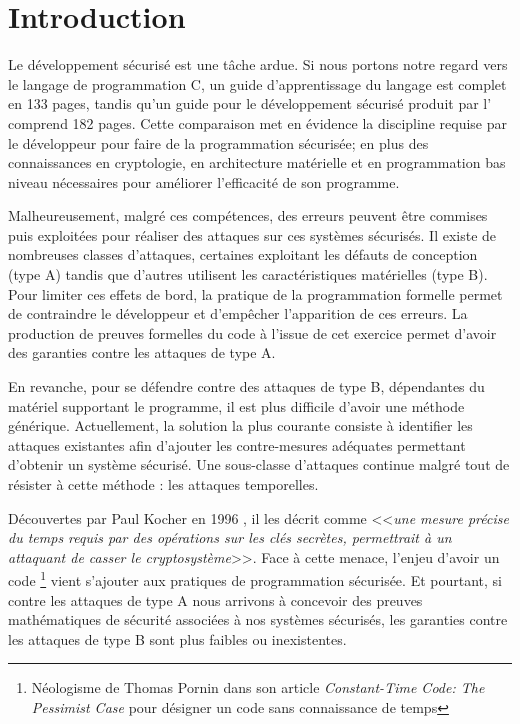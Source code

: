 \chapter*{Introduction}

Le développement sécurisé est une tâche ardue. Si nous portons notre regard vers le langage de programmation C, un guide \cite{progC_guide} d'apprentissage du langage est complet en 133 pages, tandis qu'un guide pour le développement sécurisé\cite{anssi_guideForSecureprogramming} produit par l' comprend 182 pages. Cette comparaison met en évidence la discipline requise par le développeur pour faire de la programmation sécurisée; en plus des connaissances en cryptologie, en architecture matérielle et en programmation bas niveau nécessaires pour améliorer l'efficacité de son programme. \medbreak

Malheureusement, malgré ces compétences, des erreurs peuvent être commises puis exploitées pour réaliser des attaques sur ces systèmes sécurisés. Il existe de nombreuses classes d'attaques, certaines exploitant les défauts de conception (type A) tandis que d'autres utilisent les caractéristiques matérielles (type B). Pour limiter ces effets de bord, la pratique de la programmation formelle permet de contraindre le développeur et d'empêcher l'apparition de ces erreurs. La production de preuves formelles du code à l'issue de cet exercice permet d'avoir des garanties contre les attaques de type A.\medbreak

En revanche, pour se défendre contre des attaques de type B, dépendantes du matériel supportant le programme, il est plus difficile d'avoir une méthode générique. Actuellement, la solution la plus courante consiste à identifier les attaques existantes afin d'ajouter les contre-mesures adéquates permettant d'obtenir un système sécurisé. Une sous-classe d'attaques continue malgré tout de résister à cette méthode : les attaques temporelles.\medbreak

Découvertes par Paul Kocher en 1996 \cite{crypto-1996-1469}, il les décrit comme <<\textit{une mesure précise du temps requis par des opérations sur les clés secrètes, permettrait à un attaquant de casser le cryptosystème}>>. Face à cette menace, l'enjeu d'avoir un code \textit{}\footnote{Néologisme de Thomas Pornin dans son article \textit{Constant-Time Code: The Pessimist Case} \cite{constantTimePornin} pour désigner un code sans connaissance de temps} vient s'ajouter aux pratiques de programmation sécurisée. Et pourtant, si contre les attaques de type A nous arrivons à concevoir des preuves mathématiques de sécurité associées à nos systèmes sécurisés, les garanties contre les attaques de type B sont plus faibles ou inexistentes.\medbreak

